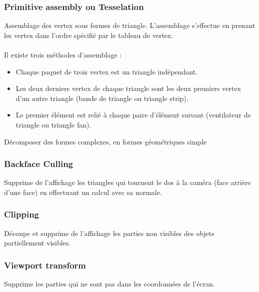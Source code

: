 \subsubsection{Primitive assembly ou Tesselation}
Assemblage des vertex sous formes de triangle. L’assemblage s’effectue en prenant les vertex dans l’ordre spécifié par le tableau de vertex.
\\\\
Il existe trois méthodes d’assemblage :
\begin{itemize}
	\item Chaque paquet de trois vertex est un triangle indépendant.
	\item Les deux derniers vertex de chaque triangle sont les deux premiers vertex d’un autre triangle (bande de triangle ou triangle strip).
	\item Le premier élément est relié à chaque paire d’élément suivant (ventilateur de triangle ou triangle fan).
	\end{itemize}
Décomposer des formes complexes, en formes géométriques simple

\subsubsection{Backface Culling}
Supprime de l’affichage les triangles qui  tournent le dos à la caméra (face arrière d’une face) en effectuant un calcul avec sa normale.
\subsubsection{Clipping}
Découpe et supprime de l’affichage les parties non visibles des objets partiellement visibles.
\subsubsection{Viewport transform}
Supprime les parties qui ne sont pas dans les coordonnées de l’écran.

